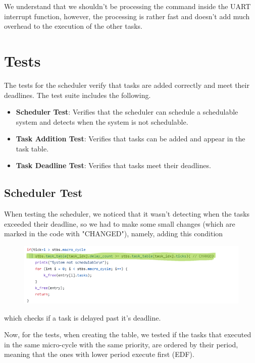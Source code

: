 \documentclass[a4paper,12pt]{article}
\begin{document}
We understand that we shouldn't be processing the command inside the UART interrupt function, however, the processing is rather fast and doesn't add much overhead to the execution of the other tasks. %

\section{Tests}
The tests for the scheduler verify that tasks are added correctly and meet their deadlines. The test suite includes the following.
\begin{itemize}
    \item \textbf{Scheduler Test}: Verifies that the scheduler can schedule a schedulable system and detects when the system is not schedulable.
    \item \textbf{Task Addition Test}: Verifies that tasks can be added and appear in the task table.
    \item \textbf{Task Deadline Test}: Verifies that tasks meet their deadlines.
\end{itemize}

\subsection{Scheduler Test}
When testing the scheduler, we noticed that it wasn't detecting when the tasks exceeded their deadline, so we had to make some small changes (which are marked in the code with "CHANGED"), namely, adding this condition
\begin{figure}[H]
    \centering
    \includegraphics[width=0.91\linewidth]{code_change.png}
    \label{fig:gantt}
\end{figure}

which checks if a task is delayed past it's deadline.

Now, for the tests, when creating the table, we tested if the tasks that executed in the same micro-cycle with the same priority, are ordered by their period, meaning that the ones with lower period execute first (EDF).
\end{document}
